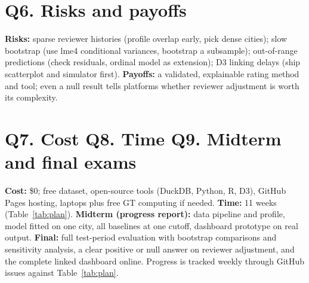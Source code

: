 \documentclass[11pt,letterpaper]{article}
\begin{document}
\section{Q6. Risks and payoffs}
\textbf{Risks:} sparse reviewer histories (profile overlap early, pick dense cities); slow bootstrap (use lme4 conditional variances, bootstrap a subsample); out-of-range predictions (check residuals, ordinal model as extension); D3 linking delays (ship scatterplot and simulator first). \textbf{Payoffs:} a validated, explainable rating method and tool; even a null result tells platforms whether reviewer adjustment is worth its complexity.

\section{Q7. Cost \quad Q8. Time \quad Q9. Midterm and final exams}
\textbf{Cost:} \$0; free dataset, open-source tools (DuckDB, Python, R, D3), GitHub Pages hosting, laptops plus free GT computing if needed. \textbf{Time:} 11 weeks (Table~\ref{tab:plan}). \textbf{Midterm (progress report):} data pipeline and profile, model fitted on one city, all baselines at one cutoff, dashboard prototype on real output. \textbf{Final:} full test-period evaluation with bootstrap comparisons and sensitivity analysis, a clear positive or null answer on reviewer adjustment, and the complete linked dashboard online. Progress is tracked weekly through GitHub issues against Table~\ref{tab:plan}.
\end{document}
